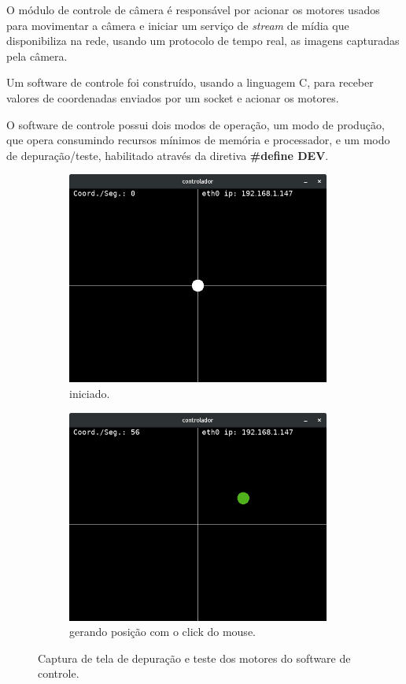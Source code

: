 O módulo de controle de câmera é responsável por acionar os motores usados para movimentar a câmera e iniciar um serviço de \textit{stream} de mídia que disponibiliza na rede, usando um protocolo de tempo real, as imagens capturadas pela câmera.\par
Um software de controle foi construído, usando a linguagem C, para receber valores de coordenadas enviados por um socket e acionar os motores.\par
O software de controle possui dois modos de operação, um modo de produção, que opera consumindo recursos mínimos de memória e processador, e um modo de depuração/teste, habilitado através da diretiva \textbf{\#define DEV}.
\begin{figure}[H]
	\centering
	\begin{subfigure}{.5\textwidth}
		\includegraphics[width=0.95\textwidth]{figuras/controlador.jpg}
		\caption{iniciado.}
		\label{fig:controlador_teste}
	\end{subfigure}%
	\begin{subfigure}{.5\textwidth}
		\includegraphics[width=0.95\textwidth]{figuras/controlador2.jpg}
		\caption{gerando posição com o click do mouse.}
		\label{fig:controlador_teste_coordenada}
	\end{subfigure}
	\caption{Captura de tela de depuração e teste dos motores do software de controle.}
\end{figure}

